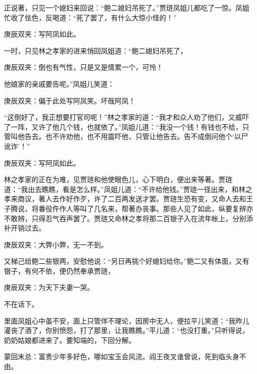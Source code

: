 \begin{parag}
    正说著，只见一个媳妇来回说：“鲍二媳妇吊死了。”贾琏凤姐儿都吃了一惊。凤姐忙收了怯色，反喝道：“死了罢了，有什么大惊小怪的！”\begin{note}庚辰双夹：写阿凤如此。\end{note}一时，只见林之孝家的进来悄回凤姐道：“鲍二媳妇吊死了，\begin{note}庚辰双夹：倒也有气性，只是又是情累一个，可怜！\end{note}他娘家的亲戚要告呢。”凤姐儿笑道：\begin{note}庚辰双夹：偏于此处写阿凤笑。坏哉阿凤！\end{note}“这倒好了，我正想要打官司呢！”林之孝家的道：“我才和众人劝了他们，又威吓了一阵，又许了他几个钱，也就依了。”凤姐儿道：“我没一个钱！有钱也不给，只管叫他告去。也不许劝他，也不用震吓他，只管让他告去。告不成倒问他个‘以尸讹诈’！”\begin{note}庚辰双夹：写阿凤如此。\end{note}林之孝家的正在为难，见贾琏和他使眼色儿，心下明白，便出来等著。贾琏道：“我出去瞧瞧，看是怎么样。”凤姐儿道：“不许给他钱。”贾琏一径出来，和林之孝来商议，著人去作好作歹，许了二百两发送才罢。贾琏生恐有变，又命人去和王子腾说，将番役仵作人等叫了几名来，帮著办丧事。那些人见了如此，纵要复辨亦不敢辨，只得忍气吞声罢了。贾琏又命林之孝将那二百银子入在流年帐上，分别添补开销过去。\begin{note}庚辰双夹：大弊小弊，无一不到。\end{note}又梯己给鲍二些银两，安慰他说：“另日再挑个好媳妇给你。”鲍二又有体面，又有银子，有何不依，便仍然奉承贾琏，\begin{note}庚辰双夹：为天下夫妻一哭。\end{note}不在话下。
\end{parag}


\begin{parag}
    里面凤姐心中虽不安，面上只管佯不理论，因房中无人，便拉平儿笑道：“我昨儿灌丧了酒了，你别愤怨，打了那里，让我瞧瞧。”平儿道：“也没打重。”只听得说，奶奶姑娘都进来了。要知端的，下回分解。
\end{parag}


\begin{parag}
    \begin{note}蒙回末总：富贵少年多好色，哪如宝玉会风流。阎王夜叉谁曾说，死到临头身不由。\end{note}
\end{parag}
